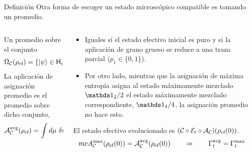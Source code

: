 \begin{frame}{Definición}
    Otra forma de escoger un estado microscópico compatible es tomando un promedio.
    \begin{columns}
        \begin{column}{0.5\textwidth}
            Un promedio sobre el conjunto
            \begin{equation}
                \Omega_{\mcC}(\rho_{\ef}) = \{\ket{\psi}\in\hilbert_{m}:\, \mcC(\dyad{\psi}) = \rho_{\ef}  \}.\nonumber
            \end{equation}
            La aplicación de asignación promedio es el promedio sobre dicho conjunto, \ie 
            \begin{equation}
            \mcA_{\mcC}^{\avg}(\rho_{\ef}) =\int d \mu\,\, \delta(\mcC(\dyad{\psi})-\rho_{\ef})\,\dyad{\psi}.\nonumber
            \end{equation}
        \end{column}
        \begin{column}{0.5\textwidth}
            \begin{itemize}
                \item Iguales si el estado efectivo inicial es puro y si la aplicación de grano grueso se reduce a una traza parcial ($p_{1}\in\{0,1\}$).
                \item Por otro lado, mientras que la asignación de máxima entropía asigna al estado máximamente mezclado $\Id_{2}/2$ el estado máximamente mezclado correspondiente, $\Id_{4}/4$, la asignación promedio no hace esto.
            \end{itemize}
            \begin{center}
                El estado efectivo evolucionado es $(\mathcal{C}\circ\mathcal{E}_{t}\circ\mathcal{A}_{\mathcal{C}})(\rho_{\text{ef}}(0))$.
                \begin{equation}
                    mcA_{\mathcal{C}}^{\max}(\rho_{\text{ef}}(0))=\mathcal{A}_{\mathcal{C}}^{\text{avg}}(\rho_{\text{ef}}(0)) \qquad \Rightarrow \qquad \Gamma_{t}^{\text{avg}}=\Gamma_{t}^{\max} \nonumber
                \end{equation}
            \end{center}
        \end{column}
    \end{columns}
\end{frame}

